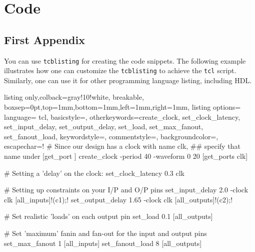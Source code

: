 \chapter{Code}
\section{First Appendix}
You can use \texttt{tcblisting} for creating the code snippets. The following example illustrates how one can customize the \texttt{tcblisting} to achieve the \texttt{tcl} script. Similarly, one can use it for other programming language listing, including HDL.

\begin{tcblisting}{listing only,colback=gray!10!white, breakable, boxsep=0pt,top=1mm,bottom=1mm,left=1mm,right=1mm,
listing options={
language= tcl,
basicstyle=\small\ttfamily, 
otherkeywords={create_clock, set_clock_latency, set_input_delay, set_output_delay, set_load, set_max_fanout, set_fanout_load},
keywordstyle=\color{blue}, 
commentstyle=\color{gray},
backgroundcolor=\color{gray!25},
escapechar=!}}
# Since our design has a clock with name clk, 
## specify that name under [get_port ]
create_clock -period 40 -waveform {0 20} [get_ports clk]

# Setting a 'delay' on the clock:
set_clock_latency 0.3 clk

# Setting up constraints on your I/P and O/P pins
set_input_delay 2.0 -clock clk [all_inputs]!\node[](c1){};!
set_output_delay 1.65 -clock clk [all_outputs]!\node[](c2){};!

# Set realistic 'loads' on each output pin
set_load 0.1 [all_outputs]

# Set 'maximum' fanin and fan-out for the input and output pins 
set_max_fanout 1 [all_inputs]
set_fanout_load 8 [all_outputs]      
\end{tcblisting}
